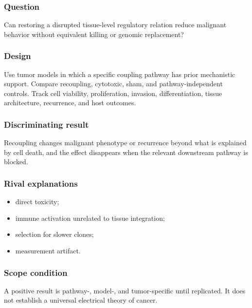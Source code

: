 \documentclass[
  11pt,
]{article}
\providecommand{\tightlist}{%
  \setlength{\itemsep}{0pt}\setlength{\parskip}{0pt}}
\begin{document}
\subsubsection{Question}\label{question-3}

Can restoring a disrupted tissue-level regulatory relation reduce
malignant behavior without equivalent killing or genomic replacement?

\subsubsection{Design}\label{design-3}

Use tumor models in which a specific coupling pathway has prior
mechanistic support. Compare recoupling, cytotoxic, sham, and
pathway-independent controls. Track cell viability, proliferation,
invasion, differentiation, tissue architecture, recurrence, and host
outcomes.

\subsubsection{Discriminating result}\label{discriminating-result-3}

Recoupling changes malignant phenotype or recurrence beyond what is
explained by cell death, and the effect disappears when the relevant
downstream pathway is blocked.

\subsubsection{Rival explanations}\label{rival-explanations-2}

\begin{itemize}
\tightlist
\item
  direct toxicity;
\item
  immune activation unrelated to tissue integration;
\item
  selection for slower clones;
\item
  measurement artifact.
\end{itemize}

\subsubsection{Scope condition}\label{scope-condition}

A positive result is pathway-, model-, and tumor-specific until
replicated. It does not establish a universal electrical theory of
cancer.
\end{document}
